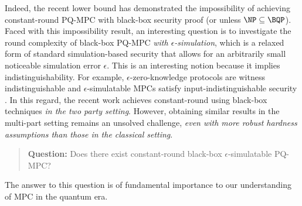 Indeed, the recent lower bound \cite{chia2022impossibility} has demonstrated the impossibility of achieving constant-round PQ-MPC with black-box security proof (or unless $\NP \subseteq \BQP$). Faced with this impossibility result, an interesting question is to investigate the round complexity of black-box PQ-MPC {\em with $\epsilon$-simulation}, which is a relaxed form of standard simulation-based security that allows for an arbitrarily small noticeable simulation error $\epsilon$. This is an interesting notion because it implies indistinguishability. For example, $\epsilon$-zero-knowledge protocols are witness indistinguishable \cite{STOC:FeiSha90} and $\epsilon$-simulatable MPCs satisfy input-indistinguishable security \cite{FOCS:MicPasRos06}. In this regard, the recent work \cite{C:CCLY22} achieves constant-round using black-box techniques {\em in the two party setting}. However, obtaining similar results in the multi-part setting remains an unsolved challenge, {\em even with more robust hardness assumptions than those in the classical setting}. 
\begin{quote}
{\bf Question:} Does there exist constant-round black-box $\epsilon$-simulatable PQ-MPC?
\end{quote}
The answer to this question is of fundamental importance to our understanding of MPC in the quantum era.








